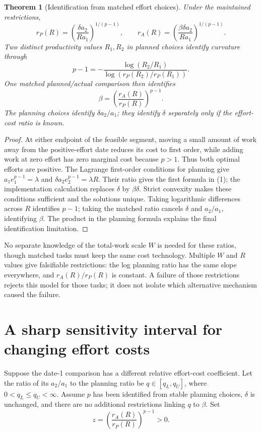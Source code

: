 \documentclass[11pt,a4paper]{article}
\newtheorem{theorem}{Theorem}[section]
\theoremstyle{definition}
\theoremstyle{remark}
\begin{document}
\begin{theorem}[Identification from matched effort choices]
Under the maintained restrictions,
\[
 r_P(R)=\left(\frac{\delta a_2}{Ra_1}\right)^{1/(p-1)},\qquad
 r_A(R)=\left(\frac{\beta\delta a_2}{Ra_1}\right)^{1/(p-1)}.\tag{1}
\]
Two distinct productivity values $R_1,R_2$ in planned choices identify curvature through
\[
 p-1=-\frac{\log(R_2/R_1)}{\log(r_P(R_2)/r_P(R_1))}.
\]
One matched planned/actual comparison then identifies
\[
 \beta=\left(\frac{r_A(R)}{r_P(R)}\right)^{p-1}.
\]
The planning choices identify $\delta a_2/a_1$; they identify $\delta$ separately only if the effort-cost ratio is known.
\end{theorem}
\begin{proof}
At either endpoint of the feasible segment, moving a small amount of work away from the positive-effort date reduces its cost to first order, while adding work at zero effort has zero marginal cost because $p>1$. Thus both optimal efforts are positive. The Lagrange first-order conditions for planning give $a_1e_1^{p-1}=\lambda$ and $\delta a_2e_2^{p-1}=\lambda R$. Their ratio gives the first formula in (1); the implementation calculation replaces $\delta$ by $\beta\delta$. Strict convexity makes these conditions sufficient and the solutions unique. Taking logarithmic differences across $R$ identifies $p-1$; taking the matched ratio cancels $\delta$ and $a_2/a_1$, identifying $\beta$. The product in the planning formula explains the final identification limitation.
\end{proof}

No separate knowledge of the total-work scale $W$ is needed for these ratios, though matched tasks must keep the same cost technology. Multiple $W$ and $R$ values give falsifiable restrictions: the log planning ratio has the same slope everywhere, and $r_A(R)/r_P(R)$ is constant. A failure of those restrictions rejects this model for those tasks; it does not isolate which alternative mechanism caused the failure.

\section{A sharp sensitivity interval for changing effort costs}
Suppose the date-1 comparison has a different relative effort-cost coefficient. Let the ratio of its $a_2/a_1$ to the planning ratio be $q\in[q_L,q_U]$, where $0<q_L\leq q_U<\infty$. Assume $p$ has been identified from stable planning choices, $\delta$ is unchanged, and there are no additional restrictions linking $q$ to $\beta$. Set
\[
 z=\left(\frac{r_A(R)}{r_P(R)}\right)^{p-1}>0.
\]
\end{document}
